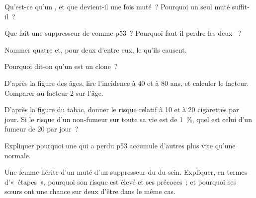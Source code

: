 \begin{exercise}[$\star$]\label{exo:g11:cancer:2}
Qu'est-ce qu'un , et que devient-il une fois muté~?
Pourquoi un seul  muté suffit-il~?
\end{exercise}

\begin{exercise}[$\star$]\label{exo:g11:cancer:3}
Que fait une  suppresseur de  comme p53~? Pourquoi
faut-il perdre les deux ~?
\end{exercise}

\begin{exercise}[$\star$]\label{exo:g11:cancer:4}
Nommer quatre  et, pour deux d'entre eux, le 
qu'ils causent.
\end{exercise}

\begin{exercise}[$\star$]\label{exo:g11:cancer:5}
Pourquoi dit-on qu'un  est un clone~?
\end{exercise}

\begin{exercise}[$\star\star$]\label{exo:g11:cancer:6}
D'après la figure des âges, lire l'incidence à 40 et à 80 ans, et
calculer le facteur. Comparer au facteur 2 sur l'âge.
\end{exercise}

\begin{exercise}[$\star\star$]\label{exo:g11:cancer:7}
D'après la figure du tabac, donner le risque relatif à 10 et à 20
cigarettes par jour. Si le risque d'un non-fumeur sur toute sa vie est
de 1~\%, quel est celui d'un fumeur de 20 par jour~?
\end{exercise}

\begin{exercise}[$\star\star$]\label{exo:g11:cancer:8}
Expliquer pourquoi une  qui a perdu p53 accumule d'autres
 plus vite qu'une  normale.
\end{exercise}

\begin{exercise}[$\star\star$]\label{exo:g11:cancer:9}
Une femme hérite d'un  muté d'un  suppresseur du  du
sein. Expliquer, en termes d'«~étapes~», pourquoi son risque est élevé
et ses  précoces~; et pourquoi ses sœurs ont une chance sur deux
d'être dans le même cas.
\end{exercise}


